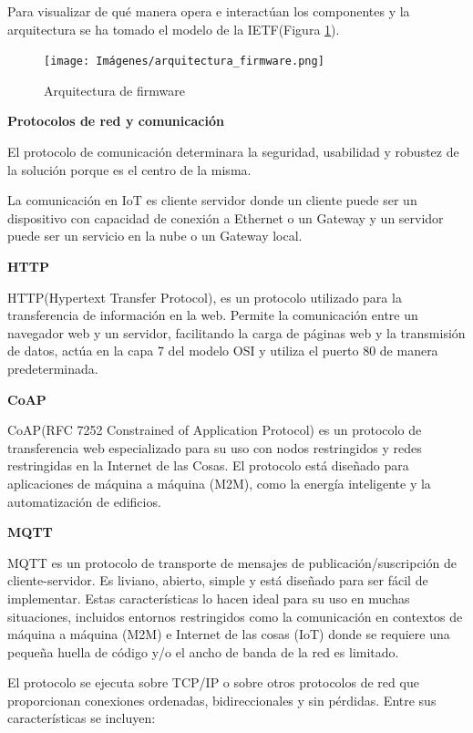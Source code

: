 Para visualizar de qué manera opera e interactúan los componentes y la arquitectura se ha tomado el modelo de la IETF(Figura \ref{fig:arquitectura_de_firmware}).\cite{rfc9019}

\begin{figure} [ht]
    \centering
     \texttt{[image: Imágenes/arquitectura\_firmware.png]}
    \caption{Arquitectura de firmware}
    \label{fig:arquitectura_de_firmware}
\end{figure}

\newpage

\textbf{Protocolos de red y comunicación}

El protocolo de comunicación determinara la seguridad, usabilidad y robustez de la solución porque es el centro de la misma.

La comunicación en IoT es cliente servidor donde un cliente puede ser un dispositivo con capacidad de conexión a Ethernet o un Gateway y un servidor puede ser un servicio en la nube o un Gateway local.\cite{brea2018hub}

\textbf{HTTP} 

HTTP(Hypertext Transfer Protocol), es un protocolo utilizado para la transferencia de información en la web. Permite la comunicación entre un navegador web y un servidor, facilitando la carga de páginas web y la transmisión de datos, actúa en la capa 7 del modelo OSI y utiliza el puerto 80 de manera predeterminada.

\textbf{CoAP} 

CoAP(RFC 7252 Constrained of Application Protocol) es un protocolo de transferencia web especializado para su uso con nodos restringidos y redes restringidas en la Internet de las Cosas. El protocolo está diseñado para aplicaciones de máquina a máquina (M2M), como la energía inteligente y la automatización de edificios.\cite{coap_space}

\textbf{MQTT} 

MQTT es un protocolo de transporte de mensajes de publicación/suscripción de cliente-servidor. Es liviano, abierto, simple y está diseñado para ser fácil de implementar. Estas características lo hacen ideal para su uso en muchas situaciones, incluidos entornos restringidos como la comunicación en contextos de máquina a máquina (M2M) e Internet de las cosas (IoT) donde se requiere una pequeña huella de código y/o el ancho de banda de la red es limitado.

El protocolo se ejecuta sobre TCP/IP o sobre otros protocolos de red que proporcionan conexiones ordenadas, bidireccionales y sin pérdidas. Entre sus características se incluyen:

